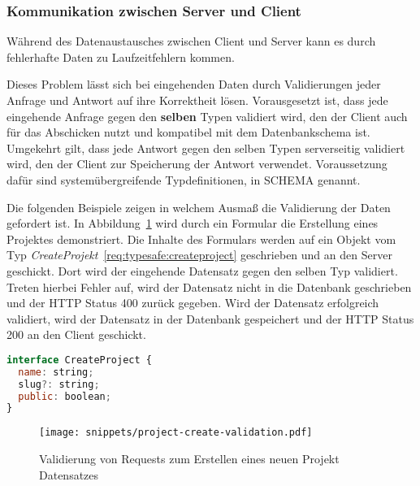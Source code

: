\subsubsection{Kommunikation zwischen Server und Client}
\label{req:typesafe:api}
Während des Datenaustausches zwischen Client und Server kann es durch fehlerhafte Daten zu Laufzeitfehlern kommen.

Dieses Problem lässt sich bei eingehenden Daten durch Validierungen jeder Anfrage und Antwort auf ihre Korrektheit lösen.
Vorausgesetzt ist, dass jede eingehende Anfrage gegen den \textbf{selben} Typen validiert wird,
den der Client auch für das Abschicken nutzt und kompatibel mit dem Datenbankschema ist.
Umgekehrt gilt, dass jede Antwort gegen den selben Typen serverseitig validiert wird, den der Client zur Speicherung der Antwort verwendet.
Voraussetzung dafür sind systemübergreifende Typdefinitionen, in  SCHEMA genannt.

Die folgenden Beispiele zeigen in welchem Ausmaß die Validierung der Daten gefordert ist. In Abbildung~\ref{req:typesafe:request-validation} wird durch ein Formular die Erstellung eines Projektes demonstriert. Die Inhalte des Formulars werden auf ein Objekt vom Typ \emph{CreateProjekt}~\ref{req:typesafe:createproject} geschrieben und an den Server geschickt. Dort wird der eingehende Datensatz gegen den selben Typ validiert. Treten hierbei Fehler auf, wird der Datensatz nicht in die Datenbank geschrieben und der HTTP Status 400 zurück gegeben.
Wird der Datensatz erfolgreich validiert, wird der Datensatz in der Datenbank gespeichert und der HTTP Status 200 an den Client geschickt.

\begin{lstlisting}[language=Javascript,float=h!,caption={Interface zum Erstellen eines Projektes}, label={req:typesafe:createproject}]
interface CreateProject {
  name: string;
  slug?: string;
  public: boolean;
}
\end{lstlisting}

\begin{figure}[h!]
	\centering
	\texttt{[image: snippets/project-create-validation.pdf]}
	\caption{Validierung von Requests zum Erstellen eines neuen Projekt Datensatzes}
	\label{req:typesafe:request-validation}
\end{figure}

